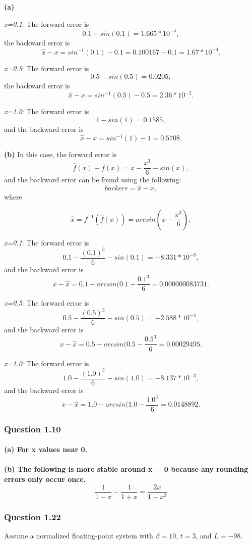 \documentclass{article}
\begin{document}
\textbf{(a)}

\textit{x=0.1}: The forward error is $$0.1 - sin(0.1) = 1.665*10^{-4},$$
the backward error is $$\hat{x} -x = sin^{-1}(0.1) -0.1 = 0.100167 - 0.1 = 
1.67*10^{-4}.$$


\textit{x=0.5}: The forward error is $$0.5 - sin(0.5) = 0.0205,$$ the backward 
error is
$$\hat{x} -x = sin^{-1}(0.5) - 0.5 = 2.36 * 10^{-2}.$$


\textit{x=1.0}: The forward error is $$1 - sin(1) = 0.1585,$$ and the backward 
error is $$\hat{x}-x=sin^{-1}(1) - 1 = 0.5708.$$

\textbf{(b)}
In this case, the forward error is $$\hat{f}(x) - f(x) = x-\frac{x^{3}}{6} - 
sin(x),$$
and the backward error can be found using the following:
$$backerr = \hat{x} - x,$$
where

$$\hat{x} = f^{-1}(\hat{f}(x)) = arcsin(x - \frac{x^{3}}{6}),$$

\textit{x=0.1}: The forward error is $$0.1-\frac{(0.1)^{3}}{6} - sin(0.1)= 
-8.331*10^{-8},$$ and the backward error is $$x - \hat{x} = 0.1 - arcsin(0.1 - 
\frac{0.1^3}{6} = 0.000000083731.$$

\textit{x=0.5}: The forward error is $$0.5-\frac{(0.5)^{3}}{6} - sin(0.5)= 
-2.588*10^{-4},$$  and the backward error is $$x - \hat{x} = 0.5 - arcsin(0.5 - 
\frac{0.5^3}{6} = 0.00029495.$$

\textit{x=1.0}: The forward error is $$1.0-\frac{(1.0)^{3}}{6}- sin(1.0) = 
-8.137*10^{-3},$$ and the backward error is $$x - \hat{x} = 1.0 - arcsin(1.0 - 
\frac{1.0^3}{6} = 0.0148892.$$

\subsubsection{Question 1.10}

\paragraph{\textbf{(a)} For x values near 0.}
\paragraph{\textbf{(b)} The following is more stable around x = 0 
because any 
rounding errors only occur once.
$$\frac{1}{1-x} - \frac{1}{1+x} = \frac{2x}{1- x^2}$$}


\subsubsection{Question 1.22}
Assume a normalized floating-point system with $\beta{} = 10$, $t = 3$, 
and
$L = -98$.
\end{document}
